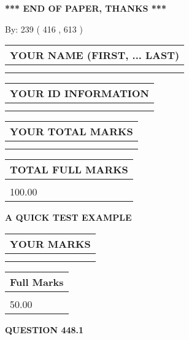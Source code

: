 \documentclass[12pt]{article}
\begin{document}
\vspace{1.0in} 
{\textbf{\large{ *** END OF PAPER, THANKS *** }}} 
   
   
\hspace{1.0in} By: 
 239 ( 416 ,  613 )
   
   
   
   
\newpage 
\setcounter{page}{ 
   448001 } 
   
   
   
   
\noindent\begin{tabular}{|l|}
\hline
YOUR NAME (FIRST, ... LAST)  \\
\hline
 \\ 
 \\ 
\hline
\end{tabular}
\hspace{0.05in} \begin{tabular}{|l|}
\hline
 YOUR   ID   INFORMATION  \\
\hline
 \\ 
 \\ 
\hline
\end{tabular}
   
   
\vspace{0.2in}\noindent\begin{tabular}{|l|}
\hline
YOUR TOTAL MARKS  \\
\hline
 \\ 
 \\ 
\hline
\end{tabular}
\hspace{0.05in} \begin{tabular}{|l|}
\hline
TOTAL FULL MARKS  \\
\hline
 \\ 
100.00 \\
\hline
\end{tabular}
   
   
 \vspace{0.2in}
{\LARGE {\textbf{ A QUICK TEST EXAMPLE}}}
   
   
  
\vspace{0.2in}
  
\noindent\begin{tabular}{|l|}
\hline
 YOUR MARKS  \\
\hline
 \\ 
 \\ 
\hline
\end{tabular}
\hspace{0.05in} \begin{tabular}{|l|}
\hline
 Full Marks  \\
\hline
 \\ 
50.00 \\
\hline
\end{tabular}
{\textbf{\Large{QUESTION
448.1 
}}}
  
\end{document}
